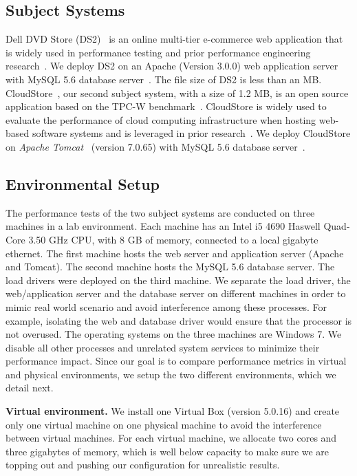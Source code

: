 \documentclass[smallextended]{svjour3}       %
\begin{document}
\subsection{Subject Systems}
Dell DVD Store (DS2)~\cite{delldvd} is an online multi-tier e-commerce web application that is widely used in performance testing and prior performance engineering research~\cite{Shang:2015:ADP:2668930.2688052,Nguyen:2012:ADP:2188286.2188344, jackicsm2009}. We deploy DS2 on an Apache (Version 3.0.0) web application server with MySQL 5.6 database server~\cite{mysql}. The file size of DS2 is less than an MB. CloudStore~\cite{cloudstore}, our second subject system, with a size of 1.2 MB, is an open source application based on the TPC-W benchmark~\cite{tpcw}. CloudStore is widely used to evaluate the performance of cloud computing infrastructure when hosting web-based software systems and is leveraged in prior research~\cite{tarekmsr16}. We deploy CloudStore on \textit{Apache Tomcat}~\cite{tomcat} (version 7.0.65) with MySQL 5.6 database server~\cite{mysql}. 


\subsection{Environmental Setup}

The performance tests of the two subject systems are conducted on three machines in a lab environment. Each machine has an Intel i5 4690 Haswell Quad-Core 3.50 GHz CPU, with 8 GB of memory, connected to a local gigabyte ethernet. The first machine hosts the web server and application server (Apache and Tomcat). The second machine hosts the MySQL 5.6 database server. The load drivers were deployed on the third machine. We separate the load driver, the web/application server and the database server on different machines in order to mimic real world scenario and avoid interference among these processes. For example, isolating the web and database driver would ensure that the processor is not overused. The operating systems on the three machines are Windows 7. We disable all other processes and unrelated system services to minimize their performance impact. Since our goal is to compare performance metrics in virtual and physical environments, we setup the two different environments, which we detail next.


\noindent \textbf{Virtual environment.} We install one Virtual Box (version 5.0.16) and create only one virtual machine on one physical machine to avoid the interference between virtual machines. For each virtual machine, we allocate two cores and three gigabytes of memory, which is well below capacity to make sure we are topping out and pushing our configuration for unrealistic results. 
\end{document}
